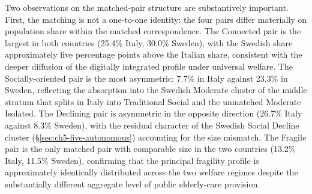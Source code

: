 Two observations on the matched-pair structure are substantively important. First, the matching is not a one-to-one identity: the four pairs differ materially on population share within the matched correspondence. The Connected pair is the largest in both countries (25.4\% Italy, 30.0\% Sweden), with the Swedish share approximately five percentage points above the Italian share, consistent with the deeper diffusion of the digitally integrated profile under universal welfare. The Socially-oriented pair is the most asymmetric: 7.7\% in Italy against 23.3\% in Sweden, reflecting the absorption into the Swedish Moderate cluster of the middle stratum that splits in Italy into Traditional Social and the unmatched Moderate Isolated. The Declining pair is asymmetric in the opposite direction (26.7\% Italy against 8.3\% Sweden), with the residual character of the Swedish Social Decline cluster (\S\ref{sec:ch5-five-autonomous}) accounting for the size mismatch. The Fragile pair is the only matched pair with comparable size in the two countries (13.2\% Italy, 11.5\% Sweden), confirming that the principal fragility profile is approximately identically distributed across the two welfare regimes despite the substantially different aggregate level of public elderly-care provision.

